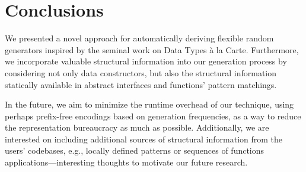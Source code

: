 \section{Conclusions}
\label{sec:conclusions}

We presented a novel approach for automatically deriving flexible random
generators inspired by the seminal work on Data Types \`a la Carte.
%
Furthermore, we incorporate valuable structural information into our generation
process by considering not only data constructors, but also the structural
information statically available in abstract interfaces and functions' pattern
matchings.


In the future, we aim to minimize the runtime overhead of our technique, using
perhaps prefix-free encodings based on generation frequencies, as a way to
reduce the representation bureaucracy as much as possible.
%
Additionally, we are interested on including additional sources of structural
information from the users' codebases, e.g., locally defined patterns or
sequences of functions applications---interesting thoughts to motivate our
future research.
